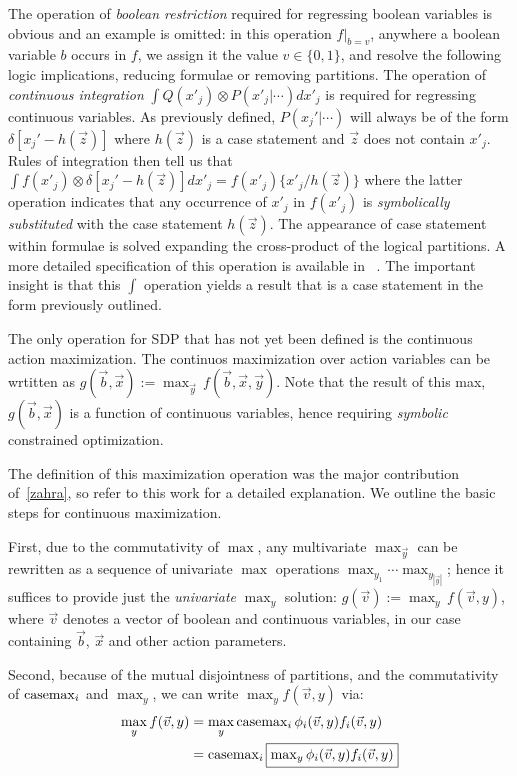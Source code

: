  The operation of \emph{boolean restriction} required for regressing boolean variables is obvious and an example is omitted: in this operation
$f|_{b=v}$, anywhere a boolean variable $b$ occurs in $f$, we assign
it the value $v \in \{ 0,1 \}$, and resolve the following logic implications, reducing formulae or removing partitions.  The operation of \emph{continuous integration} $\int Q(x'_j) \otimes P(x'_j|\cdots) dx'_j$ is required for regressing continuous variables. As previously defined, $P(x_j'|\cdots)$
will always be of the form $\delta[x_j' - h(\vec{z})]$ where
$h(\vec{z})$ is a case statement and $\vec{z}$ does not contain
$x'_j$.  Rules of integration then tell us that $\int f(x'_j) \otimes
\delta[x_j' - h(\vec{z})] dx'_j = f(x'_j) \{ x'_j / h(\vec{z}) \}$
where the latter operation indicates that any occurrence of $x'_j$ in
$f(x'_j)$ is \emph{symbolically substituted} with the case statement
$h(\vec{z})$. The appearance of case statement within formulae is solved expanding the cross-product of the logical partitions. A more detailed specification of this operation is available in ~\cite{sanner_uai11}.  The important insight is that this $\int$ operation yields a result that is a
case statement in the form previously outlined.

The only operation for SDP that has not yet been defined is the continuous action maximization.
The continuos maximization over action variables can be wrtitten as $g(\vec{b},\vec{x}) := \max_{\vec{y}} \, f(\vec{b},\vec{x},\vec{y})$. Note that the result of this max, $g(\vec{b},\vec{x})$ is a function of continuous variables, hence requiring \emph{symbolic} constrained optimization.

The definition of this maximization operation was the major contribution of~\ref{zahra}, so refer to this work for a detailed explanation. We outline the basic steps for continuous maximization.

First, due to the commutativity of $\max$, any multivariate $\max_{\vec{y}}$ can be rewritten as a sequence of univariate $\max$ operations $\max_{y_1} \cdots \max_{y_{|\vec{y}|}}$; hence it
suffices to provide just the \emph{univariate} $\max_y$ solution:
$g(\vec{v}) := \max_{y} \, f(\vec{v},y)$, where $\vec{v}$ denotes a vector of boolean and continuous variables, in our case containing $\vec{b}$, $\vec{x}$ and other action parameters.

Second, because of the mutual disjointness of partitions, and the commutativity of $\mathrm{casemax}_i$ and $\max_y$, we can write $\max_y f(\vec{v},y) $ via:
{\footnotesize
\begin{align}
\max_y f(\vec{v},y) & = 
\max_y \mathrm{casemax}_i \, \phi_i(\vec{v},y) f_i(\vec{v},y) \nonumber \\
& = \mathrm{casemax}_i \, \fbox{$\max_y \phi_i(\vec{v},y) f_i(\vec{v},y)$} \label{eq:casemax_max}
\end{align}}

